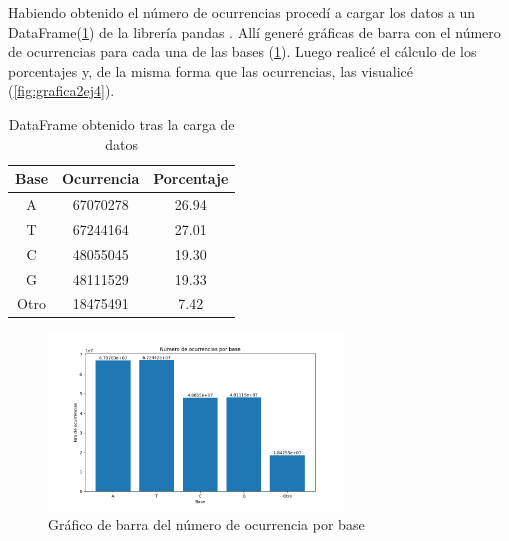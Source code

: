 Habiendo obtenido el número de ocurrencias procedí a cargar los datos a un DataFrame(\ref{fig:dfej4}) de la librería pandas \cite{noauthor_pandasdataframe_nodate}. Allí generé gráficas de barra con el número de ocurrencias para cada una de las bases (\ref{fig:grafica1ej4}). Luego realicé el cálculo de los porcentajes y, de la misma forma que las ocurrencias, las visualicé (\ref{fig:grafica2ej4}).





\begin{table}[h!]
\centering
 \begin{tabular}{|c c c|} 
 \hline
        Base &  Ocurrencia &  Porcentaje \\
        \hline
        A &    67070278 &       26.94 \\
        \hline
        T &    67244164 &       27.01 \\
        \hline
        C &    48055045 &       19.30 \\
        \hline
        G &    48111529 &       19.33 \\
        \hline
        Otro &    18475491 &        7.42 \\
 \hline
 \end{tabular}
 \caption{DataFrame obtenido tras la carga de datos}
\label{fig:dfej4}
\end{table}

\begin{figure}[H]
    \centering
    \includegraphics[width=0.70\textwidth]{Images/fig1.png}
    \caption{Gráfico de barra del número de ocurrencia por base}
    \label{fig:grafica1ej4}
\end{figure}

